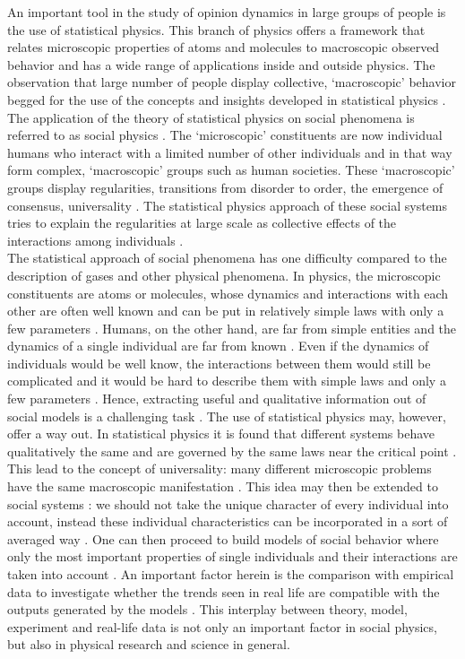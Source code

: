 \documentclass[11 pt , letterpaper , twoside , openright]{book}
\begin{document}
An important tool in the study of opinion dynamics in large groups of people is the use of statistical physics. This branch of physics offers a framework that relates microscopic properties of atoms and molecules to macroscopic observed behavior and has a wide range of applications inside and outside physics. The observation that large number of people display collective, `macroscopic' behavior begged for the use of the concepts and insights developed in statistical physics \cite{Sirbu2016}. The application of the theory of statistical physics on social phenomena is referred to as social physics \cite{Castellano2009}\cite{Galam2008}\cite{Galam1982}\cite{Stauffer2012}. The `microscopic' constituents are now individual humans who interact with a limited number of other individuals and in that way form complex, `macroscopic' groups such as human societies. These `macroscopic' groups display regularities, transitions from disorder to order, the emergence of consensus, universality \cite{Buchanan2007}. The statistical physics approach of these social systems tries to explain the regularities at large scale as collective effects of the interactions among individuals \cite{Sirbu2016}.\\
\newline
The statistical approach of social phenomena has one difficulty compared to the description of gases and other physical phenomena. In physics, the microscopic constituents are atoms or molecules, whose dynamics and interactions with each other are often well known and can be put in relatively simple laws with only a few parameters \cite{Castellano2009}. Humans, on the other hand, are far from simple entities and the dynamics of a single individual are far from known \cite{Castellano2009}. Even if the dynamics of individuals would be well know, the interactions between them would still be complicated and it would be hard to describe them with simple laws and only a few parameters \cite{Castellano2009}. Hence, extracting useful and qualitative information out of social models is a challenging task \cite{Castellano2009}. The use of statistical physics may, however, offer a way out. In statistical physics it is found that different systems behave qualitatively the same and are governed by the same laws near the critical point \cite{Hu2018}\cite{Kadanoff2010}. This lead to the concept of universality: many different microscopic problems have the same macroscopic manifestation \cite{Gug2015}\cite{Kadanoff2015}. This idea may then be extended to social systems \cite{Hu2018}: we should not take the unique character of every individual into account, instead these individual characteristics can be incorporated in a sort of averaged way \cite{Gug2015}. One can then proceed to build models of social behavior where only the most important properties of single individuals and their interactions are taken into account \cite{Castellano2009}. An important factor herein is the comparison with empirical data to investigate whether the trends seen in real life are compatible with the outputs generated by the models \cite{Castellano2009}\cite{Pawel}. This interplay between theory, model, experiment and real-life data is not only an important factor in social physics, but also in physical research and science in general.
\newpage
\noindent
\end{document}
